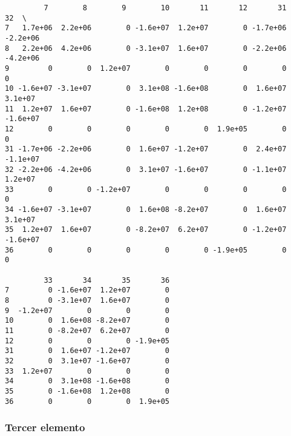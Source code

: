 \documentclass{article}
\begin{document}
    
    \begin{verbatim}
         7        8        9        10       11       12       31       32  \
7   1.7e+06  2.2e+06        0 -1.6e+07  1.2e+07        0 -1.7e+06 -2.2e+06   
8   2.2e+06  4.2e+06        0 -3.1e+07  1.6e+07        0 -2.2e+06 -4.2e+06   
9         0        0  1.2e+07        0        0        0        0        0   
10 -1.6e+07 -3.1e+07        0  3.1e+08 -1.6e+08        0  1.6e+07  3.1e+07   
11  1.2e+07  1.6e+07        0 -1.6e+08  1.2e+08        0 -1.2e+07 -1.6e+07   
12        0        0        0        0        0  1.9e+05        0        0   
31 -1.7e+06 -2.2e+06        0  1.6e+07 -1.2e+07        0  2.4e+07 -1.1e+07   
32 -2.2e+06 -4.2e+06        0  3.1e+07 -1.6e+07        0 -1.1e+07  1.2e+07   
33        0        0 -1.2e+07        0        0        0        0        0   
34 -1.6e+07 -3.1e+07        0  1.6e+08 -8.2e+07        0  1.6e+07  3.1e+07   
35  1.2e+07  1.6e+07        0 -8.2e+07  6.2e+07        0 -1.2e+07 -1.6e+07   
36        0        0        0        0        0 -1.9e+05        0        0   

         33       34       35       36  
7         0 -1.6e+07  1.2e+07        0  
8         0 -3.1e+07  1.6e+07        0  
9  -1.2e+07        0        0        0  
10        0  1.6e+08 -8.2e+07        0  
11        0 -8.2e+07  6.2e+07        0  
12        0        0        0 -1.9e+05  
31        0  1.6e+07 -1.2e+07        0  
32        0  3.1e+07 -1.6e+07        0  
33  1.2e+07        0        0        0  
34        0  3.1e+08 -1.6e+08        0  
35        0 -1.6e+08  1.2e+08        0  
36        0        0        0  1.9e+05  
    \end{verbatim}

    
    \subsubsection{Tercer elemento}\label{tercer-elemento}
\end{document}
